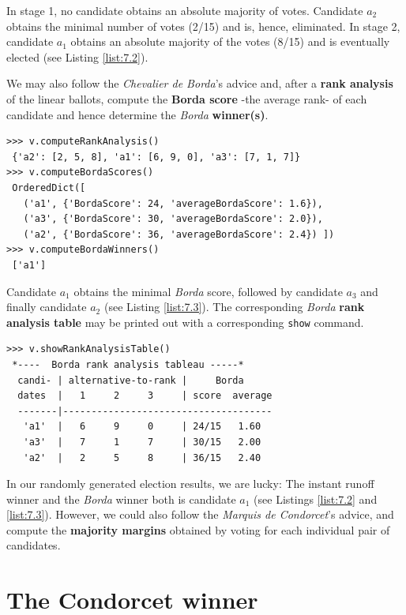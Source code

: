 In stage 1, no candidate obtains an absolute majority of votes. Candidate $a_2$ obtains the minimal number of votes (2/15) and is, hence, eliminated. In stage 2, candidate $a_1$ obtains an absolute majority of the votes (8/15) and is eventually elected (see Listing \ref{list:7.2}).

We may also follow the \emph{Chevalier de Borda}'s advice and, after a \textbf{rank analysis} of the linear ballots, compute the \textbf{Borda score} -the average rank- of each candidate and hence determine the \emph{Borda} \textbf{winner(s)}.

\begin{lstlisting}[caption={Example of \emph{Borda} rank scores},label=list:7.3,basicstyle=\footnotesize]
>>> v.computeRankAnalysis()
 {'a2': [2, 5, 8], 'a1': [6, 9, 0], 'a3': [7, 1, 7]}
>>> v.computeBordaScores()
 OrderedDict([
   ('a1', {'BordaScore': 24, 'averageBordaScore': 1.6}),
   ('a3', {'BordaScore': 30, 'averageBordaScore': 2.0}),
   ('a2', {'BordaScore': 36, 'averageBordaScore': 2.4}) ])
>>> v.computeBordaWinners()
 ['a1']
\end{lstlisting}

Candidate $a_1$ obtains the minimal \emph{Borda} score, followed by candidate $a_3$ and finally candidate $a_2$ (see Listing \ref{list:7.3}). The corresponding \emph{Borda} \textbf{rank analysis table} may be printed out with a corresponding \texttt{show} command.

\begin{lstlisting}[caption={Rank analysis example},label=list:7.4,basicstyle=\footnotesize]
>>> v.showRankAnalysisTable()
 *----  Borda rank analysis tableau -----*
  candi- | alternative-to-rank |     Borda
  dates  |   1     2     3     | score  average
  -------|-------------------------------------
   'a1'  |   6     9     0     | 24/15   1.60
   'a3'  |   7     1     7     | 30/15   2.00
   'a2'  |   2     5     8     | 36/15   2.40
 \end{lstlisting}

In our randomly generated election results, we are lucky: The instant runoff winner and the \emph{Borda} winner both is candidate $a_1$ (see Listings \ref{list:7.2} and \ref{list:7.3}). However, we could also follow the \emph{Marquis de Condorcet}'s advice, and compute the \textbf{majority margins} obtained by voting for each individual pair of candidates.

\section{The Condorcet winner}
\label{sec:7.3}

